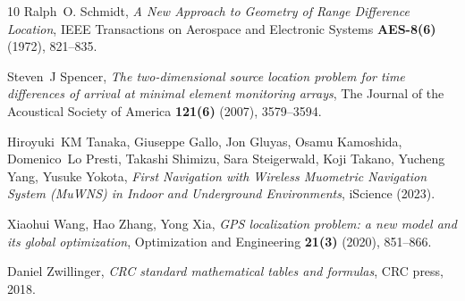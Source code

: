 \documentclass[reqno]{amsart}
\begin{document}
\begin{thebibliography}{10}
Ralph~O. Schmidt, \emph{A New Approach to Geometry of Range Difference
  Location}, IEEE Transactions on Aerospace and Electronic Systems
  \textbf{AES-8(6)} (1972), 821--835.

Steven~J Spencer, \emph{The two-dimensional source location problem for time
  differences of arrival at minimal element monitoring arrays}, The Journal of
  the Acoustical Society of America \textbf{121(6)} (2007), 3579--3594.

Hiroyuki~KM Tanaka, Giuseppe Gallo, Jon Gluyas, Osamu Kamoshida, Domenico~Lo
  Presti, Takashi Shimizu, Sara Steigerwald, Koji Takano, Yucheng Yang, Yusuke
  Yokota, \emph{First Navigation with Wireless Muometric Navigation System
  (MuWNS) in Indoor and Underground Environments}, iScience  (2023).

Xiaohui Wang, Hao Zhang, Yong Xia, \emph{GPS localization problem: a new model
  and its global optimization}, Optimization and Engineering \textbf{21(3)}
  (2020), 851--866.

Daniel Zwillinger, \emph{CRC standard mathematical tables and formulas}, CRC
  press,  2018.

\end{thebibliography}
\end{document}
